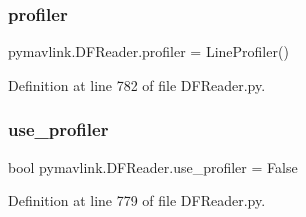 \subsubsection{\texorpdfstring{profiler}{profiler}}
{\footnotesize\ttfamily pymavlink.\+D\+F\+Reader.\+profiler = Line\+Profiler()}



Definition at line 782 of file D\+F\+Reader.\+py.

\mbox{\label{namespacepymavlink_1_1DFReader_a2b9211b6b6b7164d29bd33019992cadb}} 
\subsubsection{\texorpdfstring{use\_profiler}{use\_profiler}}
{\footnotesize\ttfamily bool pymavlink.\+D\+F\+Reader.\+use\+\_\+profiler = False}



Definition at line 779 of file D\+F\+Reader.\+py.

